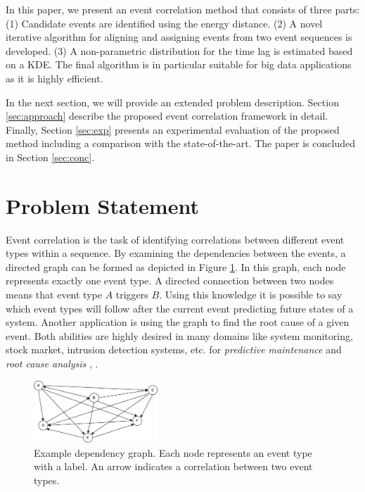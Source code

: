 \documentclass[conference]{IEEEtran}
\theoremstyle{examplestyle}
\newcommand\imgsize{0.415}
\begin{document}
In this paper, we present an event correlation method that consists of three parts:
(1) Candidate events are identified using the energy distance. (2) A novel iterative algorithm for aligning and assigning events from two event sequences is developed. (3) A non-parametric distribution for the time lag is estimated based on a \ac{KDE}.
The final algorithm is in particular suitable for big data applications as it is highly efficient. 

In the next section, we will provide an extended problem description.
Section \ref{sec:approach} describe the proposed event correlation framework in detail.
Finally, Section \ref{sec:exp} presents an experimental evaluation of the proposed method including a comparison with the state-of-the-art.
The paper is concluded in Section \ref{sec:conc}.


\section{Problem Statement}
Event correlation is the task of identifying correlations between different event types within a sequence. By examining the dependencies between the events, a directed graph can be formed as depicted in Figure \ref{fig:exampleDependencyGraph}. In this graph, each node represents exactly one event type. A directed connection between two nodes means that event type \(A\) triggers \(B\). Using this knowledge it is possible to say which event types will follow after the current event predicting future states of a system. Another application is using the graph to find the root cause of a given event. Both abilities are highly desired in many domains like system monitoring, stock market, intrusion detection systems, etc. for \textit{predictive maintenance} and \textit{root cause analysis} \cite{Zeng2015}, \cite{Benferhat2008}.


\begin{figure}[!tb]
	\centering
	\includegraphics[width=\imgsize\textwidth]{images/graph.pdf}
	\caption{Example dependency graph. Each node represents an event type with a label. An arrow indicates a correlation between two event types.}
	\label{fig:exampleDependencyGraph}
\end{figure}
\end{document}
